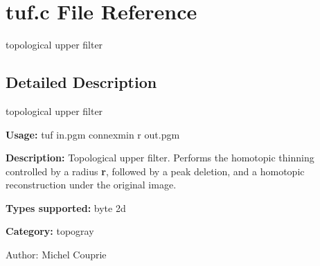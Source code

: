 \section{tuf.c File Reference}
\label{tuf_8c}
topological upper filter  




\label{_details}
\subsection{Detailed Description}
topological upper filter 

{\bf Usage:} tuf in.pgm connexmin r out.pgm

{\bf Description:} Topological upper filter. Performs the homotopic thinning controlled by a radius {\bf r}, followed by a peak deletion, and a homotopic reconstruction under the original image.

{\bf Types supported:} byte 2d

{\bf Category:} topogray

\begin{Desc}
\item[Author:]Michel Couprie \end{Desc}
